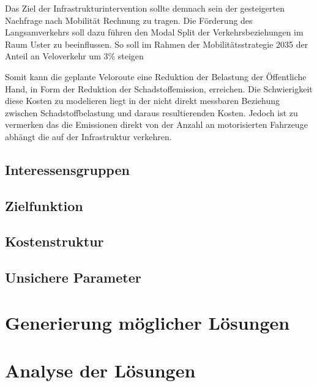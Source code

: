 Das Ziel der Infrastrukturintervention sollte demnach sein der gesteigerten Nachfrage nach Mobilität Rechnung zu tragen. Die Förderung des Langsamverkehrs soll dazu führen den Modal Split der Verkehrsbeziehungen im Raum Uster zu beeinflussen. So soll im Rahmen der Mobilitätsstrategie 2035 der Anteil an Veloverkehr um 3\% steigen %

Somit kann die geplante Veloroute eine Reduktion der Belastung der Öffentliche Hand, in Form der Reduktion der Schadstoffemission, erreichen. 	
Die Schwierigkeit diese Kosten zu modelieren liegt in der nicht direkt messbaren Beziehung zwischen Schadstoffbelastung und daraus resultierenden Kosten. Jedoch ist zu vermerken das die Emissionen direkt von der Anzahl an motorisierten Fahrzeuge abhängt die auf der Infrastruktur verkehren.

	\subsection{Interessensgruppen}
	

	\subsection{Zielfunktion}
	
	

	\subsection{Kostenstruktur}
	
	
	
	\subsection{Unsichere Parameter}
	



\section{Generierung möglicher Lösungen}
\label{sec:Varianten}




\section{Analyse der Lösungen}
\label{sec:Analyse}

